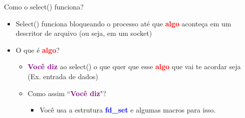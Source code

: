 \documentclass[10pt, xcolor=x11names]{beamer}
\begin{document}
\begin{frame}
	\begin{block}{Como o select() funciona?}
		\begin{itemize}
			\item<1-> Select() funciona bloqueando o processo até que \textcolor{red}{\textbf{algo}} aconteça em um descritor de arquivo (ou seja, em um socket)

			\item<2-> O que é \textcolor{red}{\textbf{algo}}?
			\begin{itemize}
				\item \textcolor{purple}{\textbf{Você diz}} ao select() o que quer que esse \textcolor{red}{\textbf{algo}} que vai te acordar seja (Ex. entrada de dados)

				\item<3-> Como assim ``\textcolor{purple}{\textbf{Você diz}}"?
					\begin{itemize}
						\item Você usa a estrutura \textcolor{blue}{\textbf{fd\_set}} e algumas macros para isso.
					\end{itemize}

			\end{itemize}

		\end{itemize}
	\end{block}
	
\end{frame}

\end{document}
